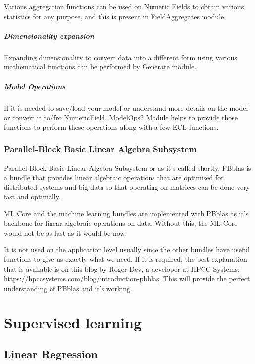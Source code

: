 Various aggregation functions can be used on Numeric Fields to obtain various statistics for any purpose, and this is present in FieldAggregates module.

\subsubsection{Dimensionality expansion}

Expanding dimensionality to convert data into a different form using various mathematical functions can be performed by Generate module.

\subsubsection{Model Operations}

If it is needed to save/load your model or understand more details on the model or convert it to/fro NumericField, ModelOps2 Module helps to provide those functions to perform these operations along with a few ECL functions.

\section{Parallel-Block Basic Linear Algebra Subsystem}\label{sec:pbblas}

Parallel-Block Basic Linear Algebra Subsystem or as it's called shortly, PBblas is a bundle that provides linear algebraic operations that are optimised for distributed systems and big data so that operating on matrices can be done very fast and optimally. 

ML Core and the machine learning bundles are implemented with PBblas as it's backbone for linear algebraic operations on data. Without this, the ML Core would not be as fast as it would be now. 

It is not used on the application level usually since the other bundles have useful functions to give us exactly what we need. If it is required, the best explanation that is available is on this blog by Roger Dev, a developer at HPCC Systems: \url{https://hpccsystems.com/blog/introduction-pbblas}. This will provide the perfect understanding of PBblas and it's working.

\part{Supervised learning}\label{part:supe}

\chapter{Linear Regression}\label{supe:linreg}

